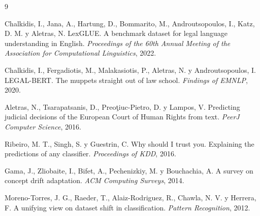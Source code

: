 \documentclass[11pt,a4paper]{article}
\begin{document}
\begin{thebibliography}{9}

Chalkidis, I., Jana, A., Hartung, D., Bommarito, M., Androutsopoulos, I., Katz, D. M. y Aletras, N.
\newblock LexGLUE. A benchmark dataset for legal language understanding in English.
\newblock \textit{Proceedings of the 60th Annual Meeting of the Association for Computational Linguistics}, 2022.

Chalkidis, I., Fergadiotis, M., Malakasiotis, P., Aletras, N. y Androutsopoulos, I.
\newblock LEGAL-BERT. The muppets straight out of law school.
\newblock \textit{Findings of EMNLP}, 2020.

Aletras, N., Tsarapatsanis, D., Preoţiuc-Pietro, D. y Lampos, V.
\newblock Predicting judicial decisions of the European Court of Human Rights from text.
\newblock \textit{PeerJ Computer Science}, 2016.

Ribeiro, M. T., Singh, S. y Guestrin, C.
\newblock Why should I trust you. Explaining the predictions of any classifier.
\newblock \textit{Proceedings of KDD}, 2016.

Gama, J., Zliobaite, I., Bifet, A., Pechenizkiy, M. y Bouchachia, A.
\newblock A survey on concept drift adaptation.
\newblock \textit{ACM Computing Surveys}, 2014.

Moreno-Torres, J. G., Raeder, T., Alaiz-Rodriguez, R., Chawla, N. V. y Herrera, F.
\newblock A unifying view on dataset shift in classification.
\newblock \textit{Pattern Recognition}, 2012.

\end{thebibliography}
\end{document}

